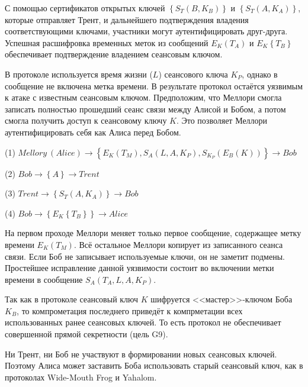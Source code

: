 С помощью сертификатов открытых ключей $\left\{ S_T \left( B, K_B \right) \right\}$ и $\left\{ S_T \left( A, K_A \right) \right\}$, которые отправляет Трент, и дальнейшего подтверждения владения соответствующими ключами, участники могут аутентифицировать друг-друга. Успешная расшифровка временных меток из сообщений $E_K \left( T_A \right)$ и $E_K \left\{ T_B \right\}$ обеспечивает подтверждение владением сеансовым ключом.

В протоколе используется время жизни ($L$) сеансового ключа $K_P$, однако в сообщение не включена метка времени. В результате протокол остаётся уязвимым к атаке с известным сеансовым ключом. Предположим, что Меллори смогла записать полностью прошедший сеанс связи между Алисой и Бобом, а потом смогла получить доступ к сеансовому ключу $K$. Это позволяет Меллори аутентифицировать себя как Алиса перед Бобом.

\begin{protocol}
    \item[(1)] $Mellory~(Alice) \to \left\{ E_K \left( T_M \right), S_A \left( L, A, K_P \right), S_{K_P} \left( E_B \left( K \right) \right) \right\} \to Bob$
    \item[(2)] $Bob \to \left\{ A \right\} \to Trent$
    \item[(3)] $Trent \to \left\{ S_T \left( A, K_A \right) \right\} \to Bob$
    \item[(4)] $Bob \to \left\{ E_K \left\{ T_B \right\} \right\} \to Alice$
\end{protocol}

На первом проходе Меллори меняет только первое сообщение, содержащее метку времени $E_K \left( T_M \right)$. Всё остальное Меллори копирует из записанного сеанса связи. Если Боб не записывает используемые ключи, он не заметит подмены. Простейшее исправление данной уязвимости состоит во включении метки времени в сообщение $S_A \left( T_A, L, A, K_P \right)$.

Так как в протоколе сеансовый ключ $K$ шифруется <<мастер>>-ключом Боба $K_B$, то компрометация последнего приведёт к компрметации всех использованных ранее сеансовых ключей. То есть протокол не обеспечивает совершенной прямой секретности (цель G9).

Ни Трент, ни Боб не участвуют в формировании новых сеансовых ключей. Поэтому Алиса может заставить Боба использовать старый сеансовый ключ, как в протоколах Wide-Mouth Frog и Yahalom.

